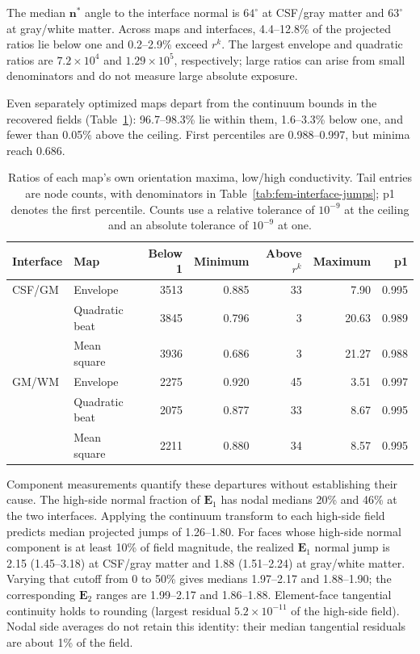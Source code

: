 \documentclass[11pt,a4paper]{article}
\providecommand{\DIFaddtex}[1]{{\protect\color{blue} \sf #1}} %
\providecommand{\DIFadd}[1]{\texorpdfstring{\DIFaddtex{#1}}{#1}} %
\begin{document}
\DIFadd{The median $\mathbf n^*$ angle to the interface normal is $64^\circ$ at
CSF/gray matter and $63^\circ$ at gray/white matter. Across maps and interfaces,
4.4--12.8\% of the projected ratios lie below one and 0.2--2.9\% exceed
$r^k$. The largest envelope and quadratic ratios are $7.2\times10^4$ and
$1.29\times10^5$, respectively; large ratios can arise from small denominators
and do not measure large absolute exposure.
}

\DIFadd{Even separately optimized maps depart from the continuum bounds in the
recovered fields (Table~\ref{tab:fem-interface-tails}): 96.7--98.3\% lie
within them, 1.6--3.3\% below one, and fewer than 0.05\% above the ceiling.
First percentiles are 0.988--0.997, but minima reach 0.686.
}

\begin{table}[htbp]
\color{blue}
\centering\small
\begin{tabular}{@{}llrrrrr@{}}
\toprule
Interface & Map & Below 1 & Minimum & Above $r^k$ & Maximum & p1\\
\midrule
CSF/GM & Envelope & 3513 & 0.885 & 33 & 7.90 & 0.995\\
 & Quadratic beat & 3845 & 0.796 & 3 & 20.63 & 0.989\\
 & Mean square & 3936 & 0.686 & 3 & 21.27 & 0.988\\
GM/WM & Envelope & 2275 & 0.920 & 45 & 3.51 & 0.997\\
 & Quadratic beat & 2075 & 0.877 & 33 & 8.67 & 0.995\\
 & Mean square & 2211 & 0.880 & 34 & 8.57 & 0.995\\
\bottomrule
\end{tabular}
\caption{\color{blue}Ratios of each map's own orientation maxima, low/high conductivity.
Tail entries are node counts, with denominators in Table~\ref{tab:fem-interface-jumps};
p1 denotes the first percentile. Counts use a relative tolerance of $10^{-9}$
at the ceiling and an absolute tolerance of $10^{-9}$ at one.}
\label{tab:fem-interface-tails}
\end{table}

\DIFadd{Component measurements quantify these departures without establishing their
cause. The high-side normal fraction of $\mathbf E_1$ has nodal medians
20\% and 46\% at the two interfaces. Applying the continuum transform to
each high-side field predicts median projected jumps of 1.26--1.80.
For faces whose high-side normal component is at least 10\% of field magnitude,
the realized $\mathbf E_1$ normal jump is 2.15 (1.45--3.18) at CSF/gray matter
and 1.88 (1.51--2.24) at gray/white matter. Varying that cutoff from 0 to 50\%
gives medians 1.97--2.17 and 1.88--1.90; the corresponding $\mathbf E_2$
ranges are 1.99--2.17 and 1.86--1.88. Element-face tangential continuity holds
to rounding (largest residual $5.2\times10^{-11}$ of the high-side field).
Nodal side averages do not retain this identity: their median tangential
residuals are about 1\% of the field.
}
\end{document}
